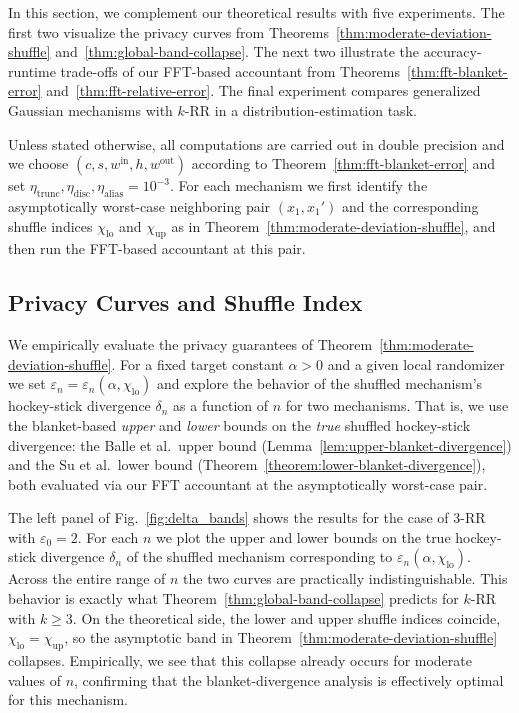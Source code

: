 \documentclass{article}
\theoremstyle{plain}
\theoremstyle{definition}
\begin{document}
In this section, we complement our theoretical results with five experiments.
The first two visualize the privacy curves from Theorems~\ref{thm:moderate-deviation-shuffle} and~\ref{thm:global-band-collapse}.
The next two illustrate the accuracy-runtime trade-offs of our FFT-based accountant from
Theorems~\ref{thm:fft-blanket-error} and~\ref{thm:fft-relative-error}.
The final experiment compares generalized Gaussian mechanisms with $k$-RR in a distribution-estimation task.


Unless stated otherwise, all computations are carried out in double precision and we choose
$(c,s,w^{\mathrm{in}},h,w^{\mathrm{out}})$ according to
Theorem~\ref{thm:fft-blanket-error} and set $\eta_{\mathrm{trunc}},
  \eta_{\mathrm{disc}},\eta_{\mathrm{alias}}=10^{-3}$.
For each mechanism we first identify the asymptotically worst-case neighboring
pair $(x_1,x_1')$ and the corresponding shuffle indices
$\chi_{\mathrm{lo}}$ and $\chi_{\mathrm{up}}$ as in
Theorem~\ref{thm:moderate-deviation-shuffle}, and then run the FFT-based
accountant at this pair.



\subsection{Privacy Curves and Shuffle Index}
\label{subsec:exp-shuffle-index}

We empirically evaluate the privacy guarantees of
Theorem~\ref{thm:moderate-deviation-shuffle}.
For a fixed target constant $\alpha>0$ and a given local randomizer we set
$
  \varepsilon_n
  = \varepsilon_n(\alpha,\chi_{\mathrm{lo}})
$
and explore the behavior of the shuffled mechanism's hockey-stick divergence
$\delta_n$ as a function of $n$ for two mechanisms.
That is, we use the blanket-based \emph{upper} and \emph{lower} bounds on the
\emph{true} shuffled hockey-stick divergence:
the Balle et al.\ upper bound
(Lemma~\ref{lem:upper-blanket-divergence}) and the Su et al.\ lower bound
(Theorem~\ref{theorem:lower-blanket-divergence}), both evaluated via our
FFT accountant at the asymptotically worst-case pair.


The left panel of Fig.~\ref{fig:delta_bands} shows the results for the case of $3$-RR with $\varepsilon_0=2$.
For each $n$ we plot the upper and lower bounds on the true hockey-stick divergence $\delta_n$ of the shuffled mechanism corresponding to $\varepsilon_n(\alpha,\chi_{\mathrm{lo}})$.
Across the entire range of $n$ the two curves are practically indistinguishable.
This behavior is exactly what Theorem~\ref{thm:global-band-collapse}
predicts for $k$-RR with $k\ge3$.
On the theoretical side, the lower and upper shuffle indices coincide,
$\chi_{\mathrm{lo}} = \chi_{\mathrm{up}}$, so the
asymptotic band in Theorem~\ref{thm:moderate-deviation-shuffle} collapses.
Empirically, we see that this collapse already occurs for moderate values
of $n$, confirming that the blanket-divergence analysis is effectively
optimal for this mechanism.
\end{document}
